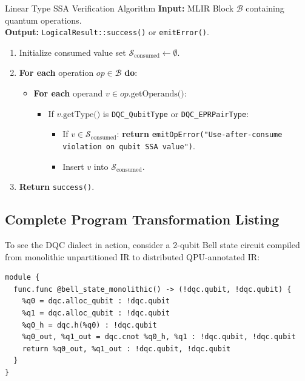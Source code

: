 \begin{algorithmbox}{Linear Type SSA Verification Algorithm}
\textbf{Input:} MLIR Block $\mathcal{B}$ containing quantum operations.\\
\textbf{Output:} \texttt{LogicalResult::success()} or \texttt{emitError()}.

\begin{enumerate}[leftmargin=1.5em]
    \item Initialize consumed value set $\mathcal{S}_{\text{consumed}} \leftarrow \emptyset$.
    \item \textbf{For each} operation $op \in \mathcal{B}$ \textbf{do}:
    \begin{itemize}
        \item \textbf{For each} operand $v \in op.\text{getOperands()}$:
        \begin{itemize}
            \item If $v.\text{getType()}$ is \texttt{DQC\_QubitType} or \texttt{DQC\_EPRPairType}:
            \begin{itemize}
                \item If $v \in \mathcal{S}_{\text{consumed}}$: \textbf{return} \texttt{emitOpError("Use-after-consume violation on qubit SSA value")}.
                \item Insert $v$ into $\mathcal{S}_{\text{consumed}}$.
            \end{itemize}
        \end{itemize}
    \end{itemize}
    \item \textbf{Return} \texttt{success()}.
\end{enumerate}
\end{algorithmbox}

\subsection{Complete Program Transformation Listing}
To see the DQC dialect in action, consider a 2-qubit Bell state circuit compiled from monolithic unpartitioned IR to distributed QPU-annotated IR:

\begin{lstlisting}[language=MLIR, caption={Monolithic DQC IR before partitioning}]
module {
  func.func @bell_state_monolithic() -> (!dqc.qubit, !dqc.qubit) {
    %q0 = dqc.alloc_qubit : !dqc.qubit
    %q1 = dqc.alloc_qubit : !dqc.qubit
    %q0_h = dqc.h(%q0) : !dqc.qubit
    %q0_out, %q1_out = dqc.cnot %q0_h, %q1 : !dqc.qubit, !dqc.qubit
    return %q0_out, %q1_out : !dqc.qubit, !dqc.qubit
  }
}
\end{lstlisting}

